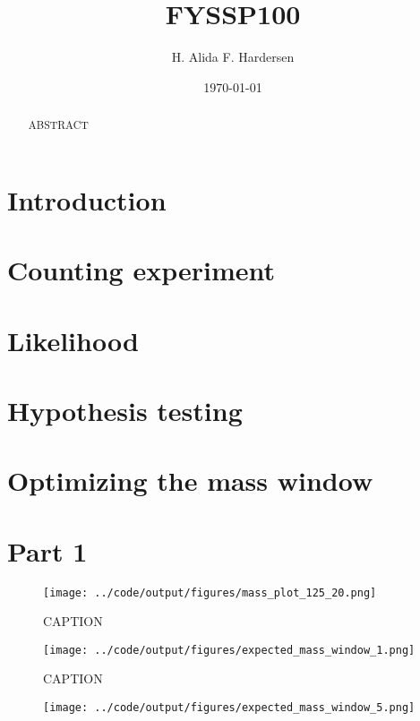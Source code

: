 \documentclass[10pt, aps, twocolumn, a4paper, nofootinbib]{revtex4}
\begin{document}
\title{FYSSP100}
\author{H. Alida F. Hardersen}
\date{\today}

\begin{abstract}
    \centering ABSTRACT
\end{abstract}
\maketitle

\section{Introduction}

\section{Counting experiment}
\section{Likelihood}
\section{Hypothesis testing}


\section{Optimizing the mass window}


\section{Part 1}

\begin{figure}
\texttt{[image: ../code/output/figures/mass\_plot\_125\_20.png]}
\caption{CAPTION\label{fig:mass_plot_125}}
\end{figure}

\begin{figure}
\texttt{[image: ../code/output/figures/expected\_mass\_window\_1.png]}
\caption{CAPTION\label{fig:mass_window_1}}
\end{figure}

\begin{figure}
\texttt{[image: ../code/output/figures/expected\_mass\_window\_5.png]}
\caption{\label{fig:mass_window_5}}
\end{figure}
\end{document}
